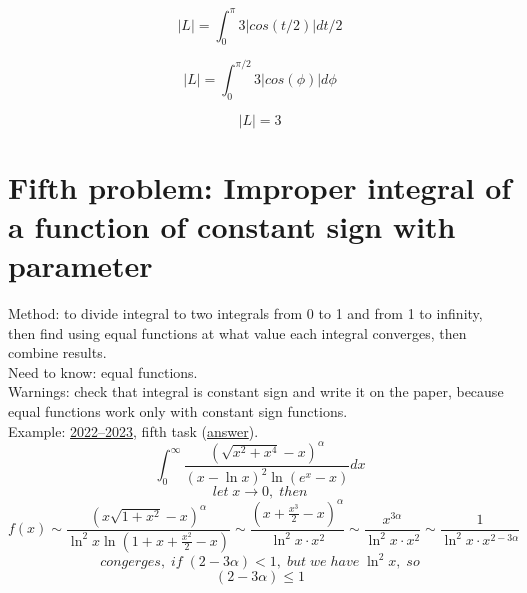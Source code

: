 \documentclass{article}
\begin{document}
\begin{equation*}
    |L| = \int_{0}^{\pi} 3 | cos(t/2) | dt/2
\end{equation*}

\begin{equation*}
    |L| = \int_{0}^{\pi/2} 3 | cos(\phi) | d\phi
\end{equation*}

\begin{equation}
    |L| = 3
\end{equation}


\newpage
\section{Fifth problem: Improper integral of a function of constant sign with parameter}
Method: to divide integral to two integrals from 0 to 1 and from 1 to infinity, then find using equal functions at what value each integral converges, then combine results. \\
Need to know: equal functions. \\
Warnings: check that integral is constant sign and write it on the paper, because equal functions work only with constant sign functions. \\
Example: \href{https://old.mipt.ru/education/chair/mathematics/exams/exams/2022-23/%D0%9C%D0%90%D0%98%D0%B8%D0%A0_%D0%92_23.pdf}{2022–2023}, fifth task (\href{https://old.mipt.ru/education/chair/mathematics/exams/exams/2022-23/%D0%9C%D0%90%D0%98%D0%B8%D0%A0_%D0%92_23%D0%BE%D1%82%D0%B2%D0%B5%D1%82%D1%8B.pdf}{answer}).
\begin{equation}
    \int_{0}^{\infty} \frac{(\sqrt{x^2+x^4}-x)^\alpha }{(x- \ln x)^2 \ln (e^x-x)} dx
\end{equation}
\begin{equation*}
    let \; x \rightarrow 0, \; then
\end{equation*}
\begin{equation*}
    f(x) \sim \frac{(x \sqrt{1+x^2}-x)^\alpha}{\ln^2 x \ln (1+x+\frac{x^2}{2}-x)} \sim \frac{(x+\frac{x^3}{2}-x)^\alpha}{\ln^2 x \cdot x^2} \sim \frac{x^{3\alpha}}{\ln^2 x \cdot x^2} \sim \frac{1}{\ln^2 x \cdot x^{2-3\alpha}}
\end{equation*}
\begin{equation*}
    congerges, \; if \; (2-3\alpha)<1, \; but \; we \; have \; \ln ^ 2 x, \; so
\end{equation*}
\begin{equation*}
    (2-3\alpha) \leq 1
\end{equation*}
\end{document}
